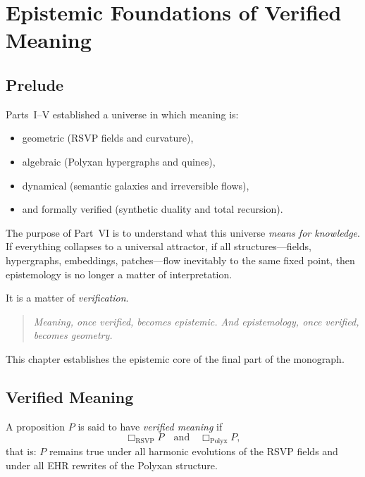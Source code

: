 \chapter{Epistemic Foundations of Verified Meaning}
\label{ch:epistemic-foundations}

\section*{Prelude}

Parts~I--V established a universe in which meaning is:
\begin{itemize}
\item geometric (RSVP fields and curvature),
\item algebraic (Polyxan hypergraphs and quines),
\item dynamical (semantic galaxies and irreversible flows),
\item and formally verified (synthetic duality and total recursion).
\end{itemize}

The purpose of Part~VI is to understand what this universe \emph{means for knowledge}.
If everything collapses to a universal attractor,  
if all structures—fields, hypergraphs, embeddings, patches—flow inevitably to the same fixed point,  
then epistemology is no longer a matter of interpretation.

It is a matter of \emph{verification}.

\bigskip

\begin{quote}
\centering
\textit{Meaning, once verified, becomes epistemic.  
And epistemology, once verified, becomes geometry.}
\end{quote}

This chapter establishes the epistemic core of the final part of the monograph.


\section{Verified Meaning}

\begin{definition}
A proposition $P$ is said to have \emph{verified meaning} if
\[
\Box_{\mathrm{RSVP}} P \quad\text{and}\quad \Box_{\mathrm{Polyx}} P,
\]
that is: $P$ remains true under all harmonic evolutions of the RSVP fields and under all
EHR rewrites of the Polyxan structure.
\end{definition}

